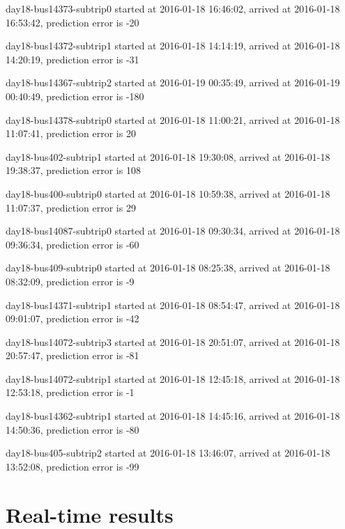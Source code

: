 \documentclass[12pt,a4paper,oneside,openright]{report}
\begin{document}
{day18-bus14373-subtrip0 started at 2016-01-18 16:46:02, arrived at 2016-01-18 16:53:42, prediction error is -20

day18-bus14372-subtrip1 started at 2016-01-18 14:14:19, arrived at 2016-01-18 14:20:19, prediction error is -31

day18-bus14367-subtrip2 started at 2016-01-19 00:35:49, arrived at 2016-01-19 00:40:49, prediction error is -180

day18-bus14378-subtrip0 started at 2016-01-18 11:00:21, arrived at 2016-01-18 11:07:41, prediction error is 20

day18-bus402-subtrip1 started at 2016-01-18 19:30:08,    arrived at 2016-01-18 19:38:37, prediction error is 108

day18-bus400-subtrip0 started at 2016-01-18 10:59:38,    arrived at 2016-01-18 11:07:37, prediction error is 29

day18-bus14087-subtrip0 started at 2016-01-18 09:30:34, arrived at 2016-01-18 09:36:34, prediction error is -60

day18-bus409-subtrip0 started at 2016-01-18 08:25:38,    arrived at 2016-01-18 08:32:09, prediction error is -9

day18-bus14371-subtrip1 started at 2016-01-18 08:54:47, arrived at 2016-01-18 09:01:07, prediction error is -42

day18-bus14072-subtrip3 started at 2016-01-18 20:51:07, arrived at 2016-01-18 20:57:47, prediction error is -81

day18-bus14072-subtrip1 started at 2016-01-18 12:45:18, arrived at 2016-01-18 12:53:18, prediction error is -1

day18-bus14362-subtrip1 started at 2016-01-18 14:45:16, arrived at 2016-01-18 14:50:36, prediction error is -80

day18-bus405-subtrip2 started at 2016-01-18 13:46:07,    arrived at 2016-01-18 13:52:08, prediction error is -99
}

\newpage

\section{Real-time results}

\label{B3}
\end{document}
